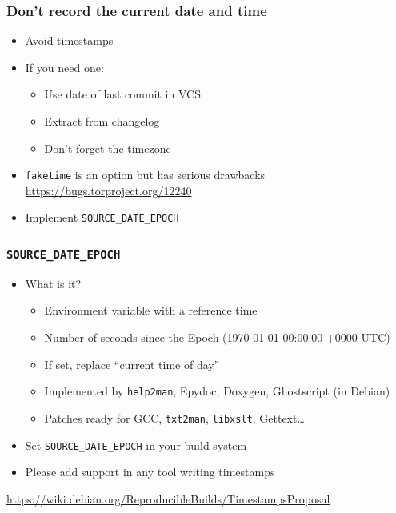\documentclass[14pt,aspectratio=169]{beamer}
\begin{document}
\begin{frame}
 \frametitle{Don't record the current date and time}

 \begin{itemize}
  \item Avoid timestamps
  \item<2-> If you need one:
    \begin{itemize}
      \item Use date of last commit in VCS
      \item Extract from changelog
      \item<3-> \alert{Don't forget the timezone}
    \end{itemize}
  \item<4-> \texttt{faketime} is an option but has serious drawbacks \\
    {\small \url{https://bugs.torproject.org/12240}}
  \item<5> Implement \texttt{SOURCE\_DATE\_EPOCH}
 \end{itemize}
\end{frame}

\begin{frame}
 \frametitle{\texttt{SOURCE\_DATE\_EPOCH}}

 \begin{itemize}
   \item What is it?
     \begin{itemize}
       \item Environment variable with a reference time
       \item Number of seconds since the Epoch (1970-01-01 00:00:00 +0000 UTC)
       \item If set, replace “current time of day”
       \item Implemented by \texttt{help2man}, Epydoc, Doxygen, Ghostscript (in Debian)
       \item Patches ready for GCC, \texttt{txt2man}, \texttt{libxslt}, Gettext…
     \end{itemize}
   \item<2-> Set \texttt{SOURCE\_DATE\_EPOCH} in your build system
   \item<3> Please add support in any tool writing timestamps
 \end{itemize}

 \begin{center}
   {\small \url{https://wiki.debian.org/ReproducibleBuilds/TimestampsProposal}}
 \end{center}
\end{frame}
\end{document}
